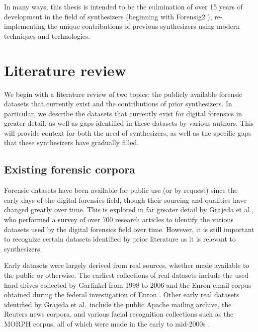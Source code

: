 \documentclass[letterpaper,12pt]{report}
\begin{document}
In many ways, this thesis is intended to be the culmination of over 15
years of development in the field of synthesizers (beginning with
Forensig2 \cite{mochForensicImageGenerator2009}), re-implementing
the unique contributions of previous synthesizers using modern
techniques and technologies.

\chapter{Literature review}\label{chapter-two}

We begin with a literature review of two topics: the publicly available
forensic datasets that currently exist and the contributions of prior
synthesizers. In particular, we describe the datasets that currently
exist for digital forensics in greater detail, as well as gaps
identified in these datasets by various authors. This will provide
context for both the need of synthesizers, as well as the specific gaps
that these synthesizers have gradually filled.

\section{Existing forensic
corpora}\label{existing-forensic-corpora}

Forensic datasets have been available for public use (or by request)
since the early days of the digital forensics field, though their
sourcing and qualities have changed greatly over time. This is explored
in far greater detail by Grajeda et al., who performed a survey of over
700 research articles to identify the various datasets used by the
digital forensics field over time. However, it is still important to
recognize certain datasets identified by prior literature as it is
relevant to synthesizers.

Early datasets were largely derived from real sources, whether made
available to the public or otherwise. The earliest collections of real
datasets include the used hard drives collected by Garfinkel from 1998
to 2006 and the Enron email corpus obtained during the federal
investigation of Enron \cite{garfinkelForensicCorporaChallenge2007}.
Other early real datasets identified by Grajeda et al.~include the
public Apache mailing archive, the Reuters news corpora, and various
facial recognition collections such as the MORPH corpus, all of which
were made in the early to mid-2000s
\cite{yannikosDataCorporaDigital2014,grajedaAvailabilityDatasetsDigital2017}.
\end{document}
